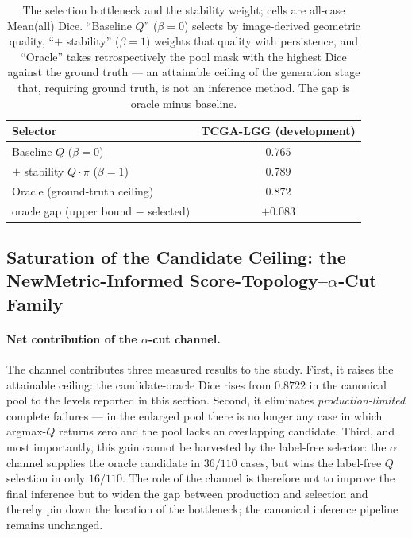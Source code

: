 \documentclass[11pt,a4paper]{article}
\begin{document}
\begin{table}[htpb!]\centering
\caption{The selection bottleneck and the stability weight; cells are all-case
Mean(all) Dice. ``Baseline $Q$'' ($\beta{=}0$) selects by image-derived geometric
quality, ``$+$ stability'' ($\beta{=}1$) weights that quality with persistence, and
``Oracle'' takes retrospectively the pool mask with the highest Dice against the
ground truth --- an attainable ceiling of the generation stage that, requiring
ground truth, is not an inference method. The gap is oracle minus baseline.}
\label{tab:selection}
\begin{tabular}{lc}
\toprule
Selector & TCGA-LGG (development) \\
\midrule
Baseline $Q$ \;($\beta{=}0$) & $0.765$ \\
$+$ stability $Q\cdot\pi$ \;($\beta{=}1$) & $\mathbf{0.789}$ \\
\midrule
Oracle (ground-truth ceiling) & $0.872$ \\
\quad oracle gap (upper bound $-$ selected) & $+0.083$ \\
\bottomrule
\end{tabular}
\end{table}

\subsection{Saturation of the Candidate Ceiling: the NewMetric-Informed Score-Topology--$\alpha$-Cut Family}\label{sec:saturation-results}

\iffalse %
\paragraph{Net contribution of the $\alpha$-cut channel.} The channel contributes
three measured results to the study. First, it raises the attainable ceiling: the
candidate-oracle Dice rises from $0.8722$ in the canonical pool to the levels
reported in this section. Second, it eliminates \emph{production-limited} complete
failures --- in the enlarged pool there is no longer any case in which argmax-$Q$
returns zero and the pool lacks an overlapping candidate. Third, and most
importantly, this gain cannot be harvested by the label-free selector: the
$\alpha$ channel supplies the oracle candidate in $36/110$ cases, but wins the
label-free $Q$ selection in only $16/110$. The role of the channel is therefore not
to improve the final inference but to widen the gap between production and
selection and thereby pin down the location of the bottleneck; the canonical
inference pipeline remains unchanged.
\end{document}
